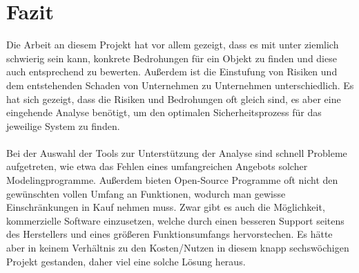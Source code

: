 \section{Fazit}
Die Arbeit an diesem Projekt hat vor allem gezeigt, dass es mit unter ziemlich schwierig sein kann, konkrete Bedrohungen für ein Objekt zu finden und diese auch entsprechend zu bewerten. Außerdem ist die Einstufung von Risiken und dem entstehenden Schaden von Unternehmen zu Unternehmen unterschiedlich. Es hat sich gezeigt, dass die Risiken und Bedrohungen oft gleich sind, es aber eine eingehende Analyse benötigt, um den optimalen Sicherheitsprozess für das jeweilige System zu finden.
\\
\\
Bei der Auswahl der Tools zur Unterstützung der Analyse sind schnell Probleme aufgetreten, wie etwa das Fehlen eines umfangreichen Angebots solcher Modelingprogramme. Außerdem bieten Open-Source Programme oft nicht den gewünschten vollen Umfang an Funktionen, wodurch man gewisse Einschränkungen in Kauf nehmen muss. Zwar gibt es auch die Möglichkeit, kommerzielle Software einzusetzen, welche durch einen besseren Support seitens des Herstellers und eines größeren Funktionsumfangs hervorstechen. Es hätte aber in keinem Verhältnis zu den Kosten/Nutzen in diesem knapp sechswöchigen Projekt gestanden, daher viel eine solche Lösung heraus.